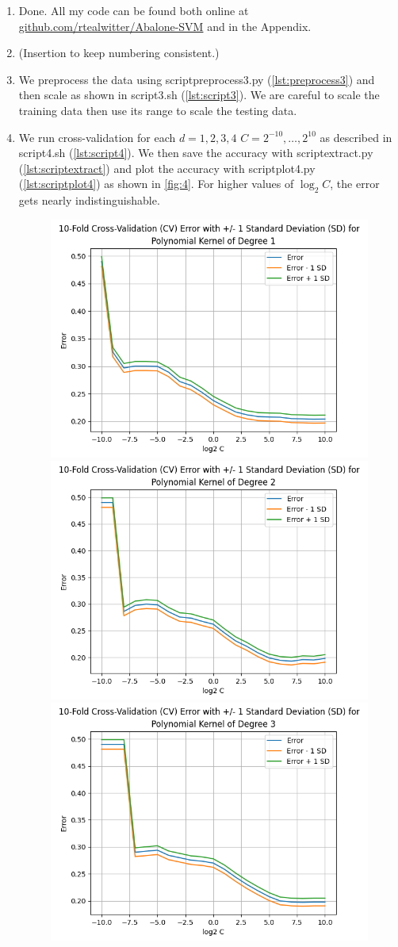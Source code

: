 \begin{enumerate}
    \item Done. All my code can be found both online at
    \href{https://github.com/rtealwitter/Abalone-SVM}{github.com/rtealwitter/Abalone-SVM}
    and in the Appendix.
    \item (Insertion to keep numbering consistent.)
    \item We preprocess the data using scriptpreprocess3.py (\autoref{lst:preprocess3})
    and then scale as shown in script3.sh (\autoref{lst:script3}).
    We are careful to scale the training data then use its range
    to scale the testing data.
    \item We run cross-validation for each $d=1,2,3,4$
    $C=2^{-10},\ldots,2^{10}$ as described in script4.sh (\autoref{lst:script4}).
    We then save the accuracy with scriptextract.py (\autoref{lst:scriptextract})
    and plot the accuracy with scriptplot4.py (\autoref{lst:scriptplot4})
    as shown in \autoref{fig:4}.
    For higher values of $\log_2 C$, the error gets nearly indistinguishable.
    \begin{figure}[ht]
        \begin{center}
            \includegraphics[width=.45\textwidth]{graphics/hw2/4.1.png}
            \includegraphics[width=.45\textwidth]{graphics/hw2/4.2.png}
            \includegraphics[width=.45\textwidth]{graphics/hw2/4.3.png}

\end{center}
\end{figure}
\end{enumerate}

